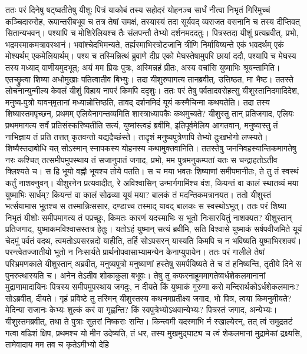 \adhyAya
{}
\vakya ततः परं दिनेषु षट्ष्वतीतेषु यीशुः पित्रं याकोबं तस्य सहोदरं योहनञ्च सार्धं नीत्वा निभृतं गिरिमुच्चं कञ्चिदारुरोह,
\vakya रूपान्तरीबभूव च तत्र तेषां समक्षं, तस्यास्यं तदा सूर्यवद् व्यराजत वसनानि च तस्य दीप्तिवत् सितान्यभवन्।
\vakya पश्यापि च मोशिरेलियश्च तैः संलपन्तौ तेभ्यो दर्शनमददतुः।
\vakya पित्रस्तदा यीशुं प्रत्यब्रवीत्, प्रभो, भद्रमस्माकमत्रावस्थानं। भवांश्चेदभिमन्यते, तर्ह्यस्माभिरत्रोटजानि त्रीणि निर्मायिष्यन्ते एकं भवदर्थम् एकं मोश्यर्थम् एकमेलियार्थम्।
\vakya पश्य च तस्मिन्नित्थं ब्रुवाणे दीप्र एको मेघस्तेषामुपरि छायां ददौ, पश्यापि च मेघस्य तस्य मध्याद् वाणीयमुदभूत्; अयं मम प्रियः पुत्रः, अस्मिन्नहं प्रीतः, अस्य वचांसि युष्माभिः श्रूयन्तामिति।
\vakya एतच्छ्रुत्वा शिष्या अधोमुखाः पतित्वातीव बिभ्युः।
\vakya तदा यीशुरुपागत्य तानब्रवीत्, उत्तिष्ठत, मा भैष्ट।
\vakya ततस्ते लोचनान्युन्मील्य केवलं यीशुं विहाय नापरं किमपि ददृशुः।
\vakya ततः परं तेषु पर्वतादवरोहत्सु यीशुस्तानिदमादिदेश, मनुष्य-पुत्रो यावन्‌मृतानां मध्यान्नोत्तिष्ठति, तावद् दर्शनमिदं यूयं कस्मैचिन्मा कथयतेति।
\vakya तदा तस्य शिष्यास्तमपृच्छन्, प्रथमम् एलियेनागन्तव्यमिति शास्त्राध्यापकैः कथमुच्यते?
\vakya यीशुस्तु तान् प्रतिजगाद, एलियः प्रथममागत्य सर्वं प्रतिसंस्करिष्यतीति सत्यं,
\vakya युष्मांस्त्वहं ब्रवीमि, इतिपूर्वमेलिय आगतवान्, मनुष्यास्तु तं नाभिज्ञाय तं प्रति तत्तत् कृतवन्तो यद्यदैच्छंस्ते। तादृशं मनुष्यपुत्रेणापि तेभ्यो दुःखभोगो लप्स्यते।
\vakya शिष्यैस्तदाबोधि यत् सोऽस्मान् स्नापकस्य योहनस्य कथामुक्तवानिति।
\vakya ततस्तेषु जननिवहस्यान्तिकमागतेषु नरः कश्चित् तत्समीपमुपस्थाय तं सजानुपातं जगाद,
\vakya प्रभो, मम पुत्रमनुकम्पतां यतः स चन्द्राहतोऽतीव क्लिश्यते च। स हि भूयो वह्नौ भूयश्च तोये पतति।
\vakya स च मया भवतः शिष्याणां समीपमानीतः, ते तु तं स्वस्थं कर्तुं नाशक्नुवन्।
\vakya यीशुरनेन प्रत्यवादीत्, रे अविश्वासिन् उन्मार्गगामिंश्च वंश, कियन्तं वा कालं स्थातव्यं मया युष्माभिः सार्धम्? कियन्तं वा कालं सोढव्या यूयं मया? बालकं तं मदन्तिकमत्रानयत।
\vakya ततो यीशुस्तं भर्त्सयामास भूतश्च स तस्मान्निःससार, दण्डाच्च तस्माद् यावद् बालकः स स्वस्थोऽभूत्।
\vakya ततः परं शिष्या निभृतं यीशोः समीपमागत्य तं पप्रच्छुः, किमतः कारणं यदस्माभिः स भूतो निःसारयितुं नाशक्यत?
\vakya यीशुस्तान् प्रतिजगाद, युष्माकमविश्वासस्तत्र हेतुः। यतोऽहं युष्मान् सत्यं ब्रवीमि, सति विश्वासे युष्माकं सर्षपवीजमिते यूयं चेदमुं पर्वतं वदथ, त्वमतोऽपसरन्नदो याहीति, तर्हि सोऽपसरन् यास्यति किमपि च न भविष्यति युष्माभिरशक्यं।
\vakya परन्त्वेतज्जातीयो भूतो न निःसार्यते प्रार्थनोपवासाभ्यामन्येन केनाप्युपायेन।
\vakya ततः परं गालीले तेषां परिभ्रमणकाले यीशुस्तान् अब्रवीत्, मनुष्यपुत्रो मनुष्याणां हस्तेषु समर्पयिष्यते ते च तं हनिष्यन्ति,
\vakya तृतीये दिने स पुनरुत्थास्यति च। अनेन तेऽतीव शोकाकुला बभूवः।
\vakya तेषु तु कफरनाहूममागतेष्वर्धशेकलमानानां मुद्राणामादायिनः पित्रस्य समीपमुपस्थाय जगदुः, न दीयते किं युष्माकं गुरुणा करो मन्दिरार्थकोऽर्धशेकलमानः?
\vakya सोऽब्रवीत्, दीयते। गृहं प्रविष्टे तु तस्मिन् यीशुस्तस्य कथनमप्रतीक्ष्य जगाद, भो पित्र, त्वया किमनुमीयते? मेदिन्या राजानः केभ्यः शुल्कं करं वा गृह्णन्ति? किं स्वपुत्रेभ्योऽथवान्येभ्यः?
\vakya पित्रस्तं जगाद, अन्येभ्यः। यीशुस्तमब्रवीत्, तथा ते पुत्राः सुतरां निष्कराः सन्ति।
\vakya किन्त्वमी यदस्माभि र्न स्खाल्येरन्, तत् त्वं समुद्रतटं गत्वा वडिशं क्षिप, प्रथमश्च यो मीन उदेष्यति, तं धर, तस्य मुखमुद्घाट्य च त्वं शेकलमानां मुद्रामेकां द्रक्ष्यसि, तामेवादाय मम तव च कृतेऽमीभ्यो देहि\eoc